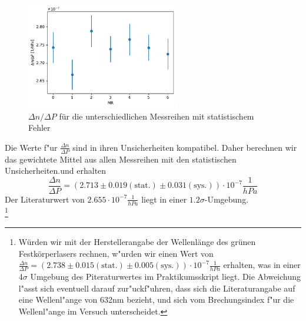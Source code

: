 \documentclass[12pt,a4paper]{article}
\begin{document}
\begin{figure}[H]
	\centering
	\includegraphics[width=0.6\textwidth]{Python/Methode1_Ergebnisse.pdf}
	\caption{$\Delta n/\Delta P$ für die unterschiedlichen Messreihen mit statistischem Fehler}
	\label{Methode1_dndP}
\end{figure}

Die Werte f"ur $\frac{\Delta n}{\Delta P}$ sind in ihren Unsicherheiten kompatibel. Daher berechnen wir das gewichtete Mittel aus allen Messreihen mit den statistischen Unsicherheiten.und erhalten
\begin{equation}
\frac{\Delta n}{\Delta P}=(2.713\pm 0.019(\text{stat.})\pm 0.031(\text{sys.}))\cdot10^{-7}\frac{1}{hPa}
\end{equation}
Der Literaturwert von $2.655\cdot10^{-7}\frac{1}{hPa}$ liegt in einer $1.2\sigma$-Umgebung.\\
\footnote{Würden wir mit der Herstellerangabe der Wellenlänge des grünen Festkörperlasers rechnen, w"urden wir einen Wert von $\frac{\Delta n}{\Delta P}=(2.738\pm 0.015(\text{stat.})\pm 0.005(\text{sys.}))\cdot10^{-7}\frac{1}{hPa}$ erhalten, was in einer 4$\sigma$ Umgebung des Piteraturwertes im Praktikumsskript liegt. Die Abweichung l"asst sich eventuell darauf zur"uckf"uhren, dass sich die Literaturangabe auf eine Wellenl"ange von 632nm bezieht, und sich vom Brechungsindex f"ur die Wellenl"ange im Versuch unterscheidet.}

\newpage
\end{document}
